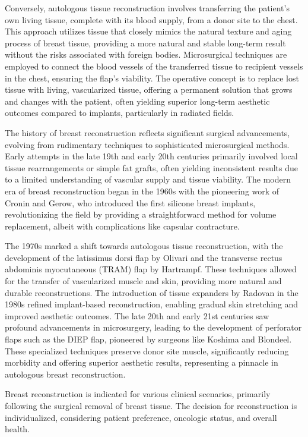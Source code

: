 Conversely, autologous tissue reconstruction involves transferring the patient's own living tissue, complete with its blood supply, from a donor site to the chest. This approach utilizes tissue that closely mimics the natural texture and aging process of breast tissue, providing a more natural and stable long-term result without the risks associated with foreign bodies. Microsurgical techniques are employed to connect the blood vessels of the transferred tissue to recipient vessels in the chest, ensuring the flap's viability. The operative concept is to replace lost tissue with living, vascularized tissue, offering a permanent solution that grows and changes with the patient, often yielding superior long-term aesthetic outcomes compared to implants, particularly in radiated fields.

The history of breast reconstruction reflects significant surgical advancements, evolving from rudimentary techniques to sophisticated microsurgical methods. Early attempts in the late 19th and early 20th centuries primarily involved local tissue rearrangements or simple fat grafts, often yielding inconsistent results due to a limited understanding of vascular supply and tissue viability. The modern era of breast reconstruction began in the 1960s with the pioneering work of Cronin and Gerow, who introduced the first silicone breast implants, revolutionizing the field by providing a straightforward method for volume replacement, albeit with complications like capsular contracture.

The 1970s marked a shift towards autologous tissue reconstruction, with the development of the latissimus dorsi flap by Olivari and the transverse rectus abdominis myocutaneous (TRAM) flap by Hartrampf. These techniques allowed for the transfer of vascularized muscle and skin, providing more natural and durable reconstructions. The introduction of tissue expanders by Radovan in the 1980s refined implant-based reconstruction, enabling gradual skin stretching and improved aesthetic outcomes. The late 20th and early 21st centuries saw profound advancements in microsurgery, leading to the development of perforator flaps such as the DIEP flap, pioneered by surgeons like Koshima and Blondeel. These specialized techniques preserve donor site muscle, significantly reducing morbidity and offering superior aesthetic results, representing a pinnacle in autologous breast reconstruction.

Breast reconstruction is indicated for various clinical scenarios, primarily following the surgical removal of breast tissue. The decision for reconstruction is individualized, considering patient preference, oncologic status, and overall health.

